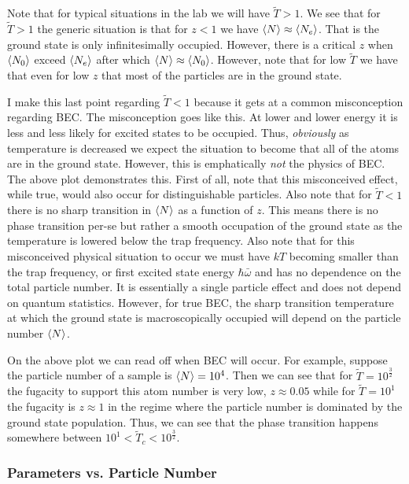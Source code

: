\documentclass[12pt]{article}
\begin{document}
Note that for typical situations in the lab we will have $\tilde{T}>1$. We see that for $\tilde{T}>1$ the generic situation is that for $z<1$ we have $\Braket{N} \approx \Braket{N_e}$. That is the ground state is only infinitesimally occupied. However, there is a critical $z$ when $\Braket{N_0}$ exceed $\Braket{N_e}$ after which $\Braket{N} \approx \Braket{N_0}$. However, note that for low $\tilde{T}$ we have that even for low $z$ that most of the particles are in the ground state.

I make this last point regarding $\tilde{T}<1$ because it gets at a common misconception regarding BEC. The misconception goes like this. At lower and lower energy it is less and less likely for excited states to be occupied. Thus, \textit{obviously} as temperature is decreased we expect the situation to become that all of the atoms are in the ground state. However, this is emphatically \textit{not} the physics of BEC. The above plot demonstrates this. First of all, note that this misconceived effect, while true, would also occur for distinguishable particles. Also note that for $\tilde{T} <1$ there is no sharp transition in $\Braket{N}$ as a function of $z$. This means there is no phase transition per-se but rather a smooth occupation of the ground state as the temperature is lowered below the trap frequency. Also note that for this misconceived physical situation to occur we must have $kT$ becoming smaller than the trap frequency, or first excited state energy $\hbar \bar{\omega}$ and has no dependence on the total particle number. It is essentially a single particle effect and does not depend on quantum statistics. However, for true BEC, the sharp transition temperature at which the ground state is macroscopically occupied will depend on the particle number $\Braket{N}$.

On the above plot we can read off when BEC will occur. For example, suppose the particle number of a sample is $\Braket{N} = 10^4$. Then we can see that for $\tilde{T} = 10^\frac{3}{2}$ the fugacity to support this atom number is very low, $z\approx 0.05$ while for $\tilde{T} = 10^1$ the fugacity is $z\approx 1$ in the regime where the particle number is dominated by the ground state population. Thus, we can see that the phase transition happens somewhere between $10^1 < \tilde{T}_c < 10^{\frac{3}{2}}$.

\subsubsection{Parameters vs. Particle Number}
\end{document}
